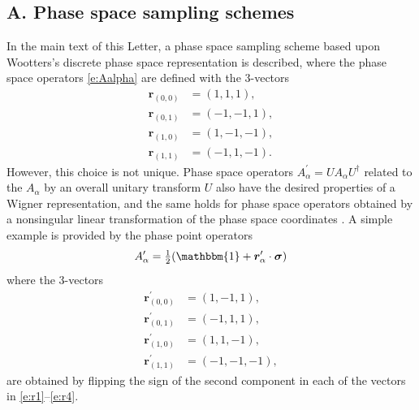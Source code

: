 \documentclass[aps,prl,showpacs,amsmath,amssymb,superscriptaddress,reprint,10pt]{revtex4-1}
\newcommand\id{{\mathbbm{1}}}
\newcommand{\mvec}[1]{\boldsymbol #1}
\begin{document}
\begin{bibunit}
\section{A. Phase space sampling schemes}
\setcounter{section}{1}
\setcounter{equation}{0}
\setcounter{figure}{0}

In the main text of this Letter, a phase space sampling scheme based upon Wootters's discrete phase space representation is described, where the phase space operators \eqref{e:Aalpha} are defined with the 3-vectors
\begin{subequations}
\begin{align}
\mvec{r}_{(0,0)}&=(1,1,1),\label{e:r1}\\
\mvec{r}_{(0,1)}&=(-1,-1,1),\\
\mvec{r}_{(1,0)}&=(1,-1,-1),\\
\mvec{r}_{(1,1)}&=(-1,1,-1).\label{e:r4}
\end{align}
\end{subequations}
However, this choice is not unique. Phase space operators $A_\alpha^\prime=UA_\alpha U^\dagger$ related to the $A_\alpha$ by an overall unitary transform $U$ also have the desired properties of a Wigner representation, and the same holds for phase space operators obtained by a nonsingular linear transformation of the phase space coordinates \cite{Wootters87}. A simple example is provided by the phase point operators
\begin{equation}
A_\alpha^\prime = \tfrac{1}{2}(\id+\mvec{r}_\alpha^\prime\cdot\mvec{\sigma})
\end{equation}
where the 3-vectors
\begin{subequations}
\begin{align}
\mvec{r}_{(0,0)}^\prime&=(1,-1,1),\\
\mvec{r}_{(0,1)}^\prime&=(-1,1,1),\\
\mvec{r}_{(1,0)}^\prime&=(1,1,-1),\\
\mvec{r}_{(1,1)}^\prime&=(-1,-1,-1),
\end{align}
\end{subequations}
are obtained by flipping the sign of the second component in each of the vectors in \eqref{e:r1}--\eqref{e:r4}.


\end{bibunit}
\end{document}
